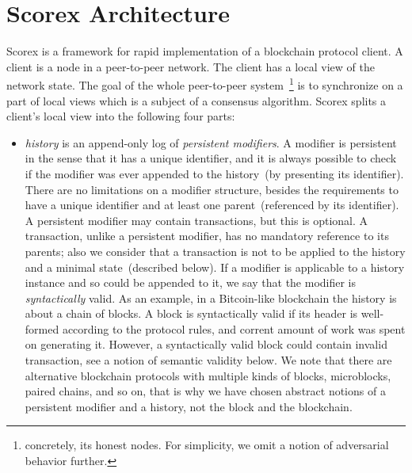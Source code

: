 
\section{Scorex Architecture}
\label{sec:scorex}

Scorex is a framework for rapid implementation of a blockchain protocol client. A client is a node in a peer-to-peer network. The client has a local view of the network state. The goal of the whole peer-to-peer system~\footnote{concretely, its honest nodes. For simplicity, we omit a notion of adversarial behavior further.} is to synchronize on a part of local views which is a subject of a consensus algorithm. Scorex splits a client's local view into the following four parts: 

\begin{itemize}
\item{\em history} is an append-only log of {\em persistent modifiers}. A modifier is persistent in the sense that it has a unique identifier, and it is always possible to check if the modifier was ever appended to the history~(by presenting its identifier). There are no limitations on a modifier structure, besides the requirements to have a unique identifier and at least one parent~(referenced by its identifier). A persistent modifier may contain transactions, but this is optional. A transaction, unlike a persistent modifier, has no mandatory reference to its parents; also we consider that a transaction is not to be applied to the history and a minimal state~(described below). If a modifier is applicable to a history instance and so could be appended to it, we say that the modifier is {\em syntactically} valid. As an example, in a Bitcoin-like blockchain the history is about a chain of blocks. A block is syntactically valid if its header is well-formed according to the protocol rules, and corrent amount of work was spent on generating it. However, a syntactically valid block could contain invalid transaction, see a notion of semantic validity below. We note that there are alternative blockchain protocols with multiple kinds of blocks, microblocks, paired chains, and so on, that is why we have chosen abstract notions of a persistent modifier and a history, not the block and the blockchain.   


\end{itemize}
